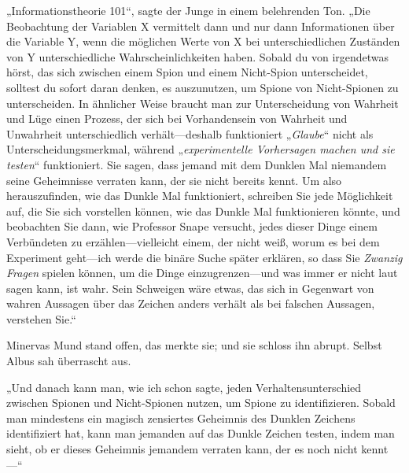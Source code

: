 „Informationstheorie 101“, sagte der Junge in einem belehrenden Ton. „Die Beobachtung der Variablen X vermittelt dann und nur dann Informationen über die Variable Y, wenn die möglichen Werte von X bei unterschiedlichen Zuständen von Y unterschiedliche Wahrscheinlichkeiten haben. Sobald du von irgendetwas hörst, das sich zwischen einem Spion und einem Nicht-Spion unterscheidet, solltest du sofort daran denken, es auszunutzen, um Spione von Nicht-Spionen zu unterscheiden. In ähnlicher Weise braucht man zur Unterscheidung von Wahrheit und Lüge einen Prozess, der sich bei Vorhandensein von Wahrheit und Unwahrheit unterschiedlich verhält—deshalb funktioniert „\emph{Glaube}“ nicht als Unterscheidungsmerkmal, während „\emph{experimentelle Vorhersagen machen und sie testen}“ funktioniert. Sie sagen, dass jemand mit dem Dunklen Mal niemandem seine Geheimnisse verraten kann, der sie nicht bereits kennt. Um also herauszufinden, wie das Dunkle Mal funktioniert, schreiben Sie jede Möglichkeit auf, die Sie sich vorstellen können, wie das Dunkle Mal funktionieren könnte, und beobachten Sie dann, wie Professor Snape versucht, jedes dieser Dinge einem Verbündeten zu erzählen—vielleicht einem, der nicht weiß, worum es bei dem Experiment geht—ich werde die binäre Suche später erklären, so dass Sie \emph{Zwanzig Fragen} spielen können, um die Dinge einzugrenzen—und was immer er nicht laut sagen kann, ist wahr. Sein Schweigen wäre etwas, das sich in Gegenwart von wahren Aussagen über das Zeichen anders verhält als bei falschen Aussagen, verstehen Sie.“

Minervas Mund stand offen, das merkte sie; und sie schloss ihn abrupt. Selbst Albus sah überrascht aus.

„Und danach kann man, wie ich schon sagte, jeden Verhaltensunterschied zwischen Spionen und Nicht-Spionen nutzen, um Spione zu identifizieren. Sobald man mindestens ein magisch zensiertes Geheimnis des Dunklen Zeichens identifiziert hat, kann man jemanden auf das Dunkle Zeichen testen, indem man sieht, ob er dieses Geheimnis jemandem verraten kann, der es noch nicht kennt—“


